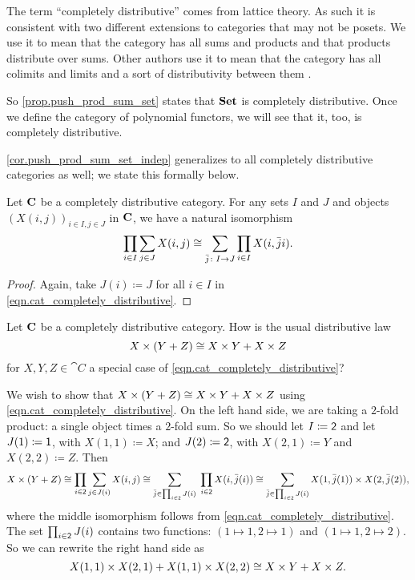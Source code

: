 \documentclass[Book-Poly]{subfiles}
\begin{document}
The term ``completely distributive'' comes from lattice theory. As such it is consistent with two different extensions to categories that may not be posets. We use it to mean that the category has all sums and products and that products distribute over sums. Other authors use it to mean that the category has all colimits and limits and a sort of distributivity between them .

So \cref{prop.push_prod_sum_set} states that $\mathbf{Set}$ is completely distributive.
Once we define the category of polynomial functors, we will see that it, too, is completely distributive.

\cref{cor.push_prod_sum_set_indep} generalizes to all completely distributive categories as well; we state this formally below.

\begin{corollary} \label{cor.push_prod_sum_obj_indep}
    Let $\mathbf{C}$ be a completely distributive category.
    For any sets $I$ and $J$ and objects $(X(i, j))_{i \in I, j \in J}$ in $\mathbf{C}$, we have a natural isomorphism
    \begin{equation} \label{eqn.push_prod_sum_obj_indep}
        \prod_{i\in I}\sum_{j\in J}X(i,j)\cong\sum_{\bar{j}\colon I\to J}\prod_{i\in I}X(i,\bar{j}i).
    \end{equation}
\end{corollary}
\begin{proof}
    Again, take $J(i)\coloneqq J$ for all $i \in I$ in \eqref{eqn.cat_completely_distributive}.
\end{proof}

\begin{exercise}
    Let $\mathbf{C}$ be a completely distributive category.
    How is the usual distributive law
    \[
    X\times(Y+Z)\cong X\times Y+X\times Z
    \]
    for $X,Y,Z\in\cat{C}$ a special case of \eqref{eqn.cat_completely_distributive}?
    \begin{solution}
        We wish to show that $X\times (Y+Z)\cong X\times Y+X\times Z$ using \eqref{eqn.cat_completely_distributive}.
        On the left hand side, we are taking a $2$-fold product: a single object times a $2$-fold sum.
        So we should let $I\coloneqq\textsf{2}$ and let $J(1)\coloneqq\textsf{1}$, with $X(1,1)\coloneqq X$; and $J(2)\coloneqq\textsf{2}$, with $X(2,1)\coloneqq Y$ and $X(2,2)\coloneqq Z$.
        Then
        \[
        X\times(Y+Z)\cong \prod_{i\in\textsf{2}}\sum_{j\in J(i)}X(i,j) \cong \sum_{\bar{j}\in\prod_{i\in\textsf{2}}J(i)}\;\prod_{i\in \textsf{2}}X(i,\bar{j}(i)) \cong \sum_{\bar{j}\in\prod_{i\in\textsf{2}}J(i)}X(1,\bar{j}(1))\times X(2,\bar{j}(2)),
        \]
        where the middle isomorphism follows from \eqref{eqn.cat_completely_distributive}.
        The set $\prod_{i\in\textsf{2}}J(i)$ contains two functions: $(1\mapsto1,2\mapsto1)$ and $(1\mapsto1,2\mapsto2)$.
        So we can rewrite the right hand side as
        \[
        X(1,1)\times X(2,1)+X(1,1)\times X(2,2)\cong X\times Y+X\times Z.
        \]
    \end{solution}
\end{exercise}
\end{document}
